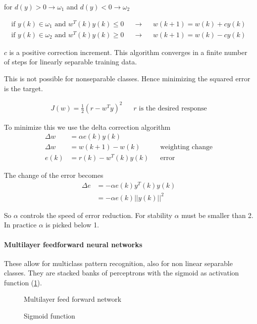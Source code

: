 for $d(y)>0 \rightarrow \omega_1$ and $d(y)<0 \rightarrow \omega_2$

\begin{align*}
\text{if } y(k) \in \omega_1 \text{ and } w^T(k)y(k) \leq 0 && \rightarrow && w(k+1) = w(k) +cy(k) \\
\text{if } y(k) \in \omega_2 \text{ and } w^T(k)y(k) \geq 0 && \rightarrow && w(k+1) = w(k)-cy(k)
\end{align*}


$c$ is a positive correction increment.
This algorithm converges in a finite number of steps for linearly separable training data.

This is not possible for nonseparable classes.
Hence minimizing the squared error is the target.

\begin{align*}
J(w) = \frac{1}{2}(r-w^Ty)^2
&& r \text{ is the desired response}
\end{align*}

To minimize this we use the delta correction algorithm
\begin{align*}
\Delta w &= \alpha e(k)y(k) \\
\Delta w &= w(k+1)-w(k) && \text{weighting change} \\
e(k) &= r(k) - w^T(k)y(k) && \text{error}
\end{align*}

The change of the error becomes
\begin{align*}
\Delta e &= -\alpha e(k) y^T(k) y(k) \\
 &= - \alpha e(k) ||y(k)||^2
\end{align*}

So $\alpha$ controls the speed of error reduction.
For stability $\alpha$ must be smaller than 2.
In practice $\alpha$ is picked below 1.

\paragraph{Multilayer feedforward neural networks}
These allow for multiclass pattern recognition, also for non linear separable classes.
They are stacked banks of perceptrons with the sigmoid as activation function (\ref{fig:sigmoid}).

\begin{figure}[htp]
\centering

\caption{Multilayer feed forward network}
\end{figure}

\begin{figure}[htp]
\centering

\caption{Sigmoid function}
\label{fig:sigmoid}
\end{figure}

